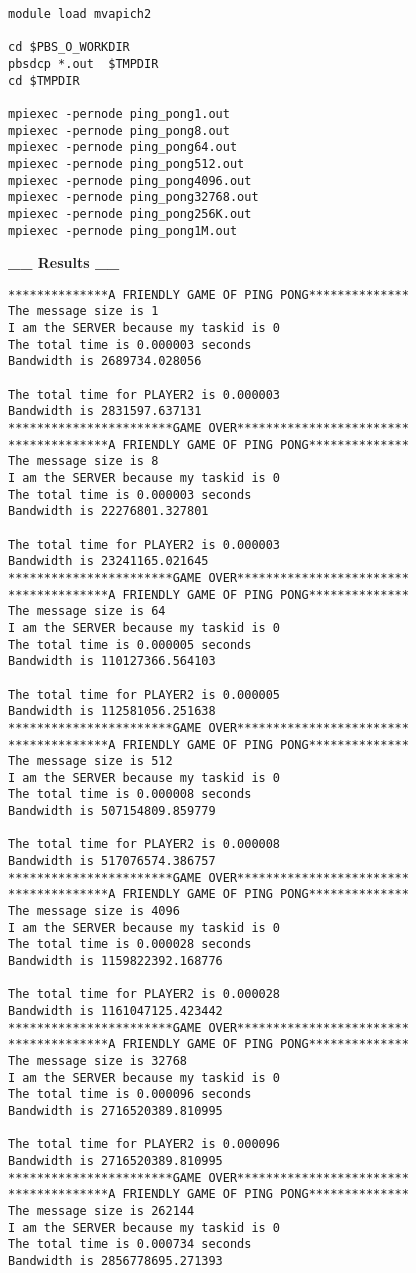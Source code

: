 \documentclass[11pt]{article}
\begin{document}
\begin{enumerate}
\begin{center}
\begin{lstlisting}
module load mvapich2

cd $PBS_O_WORKDIR
pbsdcp *.out  $TMPDIR
cd $TMPDIR

mpiexec -pernode ping_pong1.out
mpiexec -pernode ping_pong8.out
mpiexec -pernode ping_pong64.out
mpiexec -pernode ping_pong512.out
mpiexec -pernode ping_pong4096.out
mpiexec -pernode ping_pong32768.out
mpiexec -pernode ping_pong256K.out
mpiexec -pernode ping_pong1M.out

\end{lstlisting}
\textbf{\_\_ Results \_\_}
\begin{lstlisting}
**************A FRIENDLY GAME OF PING PONG**************
The message size is 1
I am the SERVER because my taskid is 0
The total time is 0.000003 seconds
Bandwidth is 2689734.028056

The total time for PLAYER2 is 0.000003
Bandwidth is 2831597.637131
***********************GAME OVER************************
**************A FRIENDLY GAME OF PING PONG**************
The message size is 8
I am the SERVER because my taskid is 0
The total time is 0.000003 seconds
Bandwidth is 22276801.327801

The total time for PLAYER2 is 0.000003
Bandwidth is 23241165.021645
***********************GAME OVER************************
**************A FRIENDLY GAME OF PING PONG**************
The message size is 64
I am the SERVER because my taskid is 0
The total time is 0.000005 seconds
Bandwidth is 110127366.564103

The total time for PLAYER2 is 0.000005
Bandwidth is 112581056.251638
***********************GAME OVER************************
**************A FRIENDLY GAME OF PING PONG**************
The message size is 512
I am the SERVER because my taskid is 0
The total time is 0.000008 seconds
Bandwidth is 507154809.859779

The total time for PLAYER2 is 0.000008
Bandwidth is 517076574.386757
***********************GAME OVER************************
**************A FRIENDLY GAME OF PING PONG**************
The message size is 4096
I am the SERVER because my taskid is 0
The total time is 0.000028 seconds
Bandwidth is 1159822392.168776

The total time for PLAYER2 is 0.000028
Bandwidth is 1161047125.423442
***********************GAME OVER************************
**************A FRIENDLY GAME OF PING PONG**************
The message size is 32768
I am the SERVER because my taskid is 0
The total time is 0.000096 seconds
Bandwidth is 2716520389.810995

The total time for PLAYER2 is 0.000096
Bandwidth is 2716520389.810995
***********************GAME OVER************************
**************A FRIENDLY GAME OF PING PONG**************
The message size is 262144
I am the SERVER because my taskid is 0
The total time is 0.000734 seconds
Bandwidth is 2856778695.271393


\end{lstlisting}
\end{center}
\end{enumerate}
\end{document}
